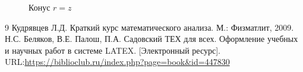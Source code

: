 \begin{figure}[h!]
\centering
{}
\caption{Конус $r = z$}
\label{fig:cone}
\end{figure}

\begin{thebibliography}{9}
     Кудрявцев Л.Д. Краткий курс математического анализа. М.: Физматлит, 2009.
     Н.С. Беляков, В.Е. Палош, П.А. Садовский ТЕХ для всех. Оформление учебных и научных работ в системе LATEX. [Электронный ресурс]. URL:\url{https://biblioclub.ru/index.php?page=book&id=447830}

\end{thebibliography}


